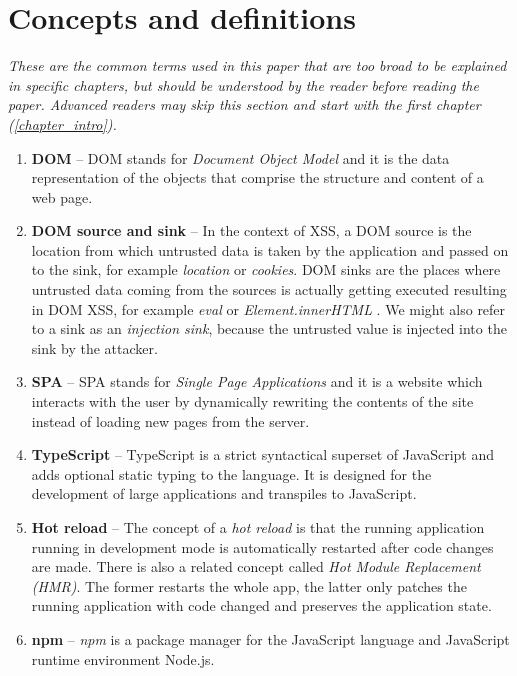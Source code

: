 \chapter*{Concepts and definitions} %
\label{definitions}

\emph{These are the common terms used in this paper that are too broad to be explained in specific
  chapters, but should be understood by the reader before reading the paper. Advanced readers may
  skip this section and start with the first chapter (\ref{chapter_intro}).}

\begin{enumerate}
  \item \label{def:dom} \textbf{DOM} -- DOM stands for \emph{Document Object Model} and it is
        the data representation of the objects that comprise the structure and content of a web
        page.
  \item \label{def:dom_source_sink} \textbf{DOM source and sink} -- In the context of XSS, a DOM
        source is the location from which untrusted data is taken by the application and passed on
        to the sink, for example \emph{location} or \emph{cookies}. DOM sinks are the places where
        untrusted data coming from the sources is actually getting executed resulting in DOM XSS,
        for example \emph{eval} or \emph{Element.innerHTML} \cite{source_sink_definition}. We might
        also refer to a sink as an \emph{injection sink}, because the untrusted value is injected
        into the sink by the attacker.
  \item \label{def:spa} \textbf{SPA} -- SPA stands for \emph{Single Page Applications} and it
        is a website which interacts with the user by dynamically rewriting the contents of the site
        instead of loading new pages from the server.
  \item \label{def:ts} \textbf{TypeScript} -- TypeScript is a strict syntactical superset of
        JavaScript and adds optional static typing to the language. It is designed for the
        development of large applications and transpiles to JavaScript.
  \item \label{def:hot_reload} \textbf{Hot reload} -- The concept of a \emph{hot reload} is that the
        running application running in development mode is automatically restarted after code
        changes are made. There is also a related concept called \emph{Hot Module Replacement
          (HMR)}. The former restarts the whole app, the latter only patches the running application
        with code changed and preserves the application state.
  \item \label{def:npm} \textbf{npm} -- \emph{npm} is a package manager for the JavaScript
        language and JavaScript runtime environment Node.js.
\end{enumerate}
